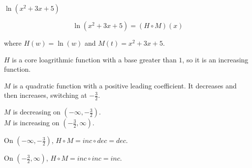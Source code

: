 \documentclass{ximera}
\begin{document}
\begin{example}   $\ln(x^2 + 3x + 5)$




\[  \ln(x^2 + 3x + 5)   = (H \circ M)(x)\]

where $H(w) = \ln(w)$ and $M(t) = x^2 + 3x + 5$.


$H$ is a core loagrithmic function with a base greater than $1$, so it is an increasing function.


$M$ is a quadratic function with a positive leading coefficient. It decreases and then increases, switching at $-\frac{3}{2}$.

$M$ is decreasing on $\left( -\infty, -\frac{3}{2} \right)$.\\
$M$ is increasing on $\left( -\frac{3}{2}, \infty \right)$.






On $\left( -\infty, -\frac{3}{2} \right)$, $H \circ M = inc \circ dec = dec$.


On $\left( -\frac{3}{2}, \infty \right)$, $H \circ M = inc \circ inc = inc$.


\end{example}
\end{document}
